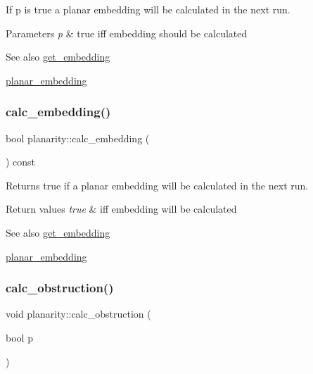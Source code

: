 If {\ttfamily p} is true a planar embedding will be calculated in the next run. 


\begin{DoxyParams}{Parameters}
{\em p} & {\ttfamily true} iff embedding should be calculated\\
\hline
\end{DoxyParams}
\begin{DoxySeeAlso}{See also}
\mbox{\hyperlink{classplanarity_a9ab79a340e361c3300cc08e82edd4e12}{get\+\_\+embedding}} 

\mbox{\hyperlink{classplanar__embedding}{planar\+\_\+embedding}} 
\end{DoxySeeAlso}
\mbox{\label{classplanarity_aea94b0de2deb46ef774179dd3572bf2d}} 
\subsubsection{\texorpdfstring{calc\+\_\+embedding()}{calc\_embedding()}\hspace{0.1cm}{\footnotesize\ttfamily [2/2]}}
{\footnotesize\ttfamily bool planarity\+::calc\+\_\+embedding (\begin{DoxyParamCaption}{ }\end{DoxyParamCaption}) const\hspace{0.3cm}{\ttfamily [inline]}}



Returns true if a planar embedding will be calculated in the next run. 


\begin{DoxyRetVals}{Return values}
{\em true} & iff embedding will be calculated\\
\hline
\end{DoxyRetVals}
\begin{DoxySeeAlso}{See also}
\mbox{\hyperlink{classplanarity_a9ab79a340e361c3300cc08e82edd4e12}{get\+\_\+embedding}} 

\mbox{\hyperlink{classplanar__embedding}{planar\+\_\+embedding}} 
\end{DoxySeeAlso}
\mbox{\label{classplanarity_a7b8e8e5414a4eedb0f99253d3b62ffa3}} 
\subsubsection{\texorpdfstring{calc\+\_\+obstruction()}{calc\_obstruction()}\hspace{0.1cm}{\footnotesize\ttfamily [1/2]}}
{\footnotesize\ttfamily void planarity\+::calc\+\_\+obstruction (\begin{DoxyParamCaption}\item[{bool}]{p }\end{DoxyParamCaption})\hspace{0.3cm}{\ttfamily [inline]}}



